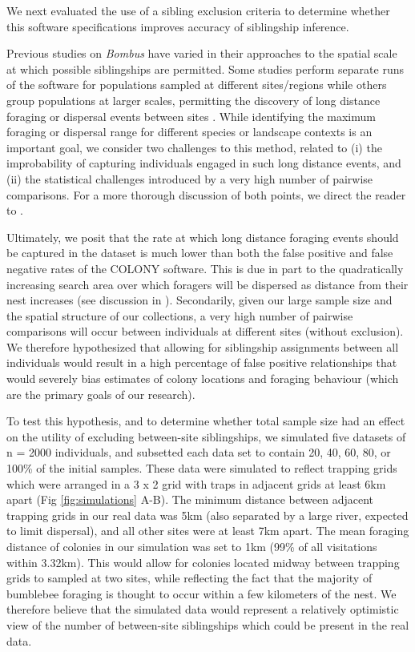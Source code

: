 \documentclass[12pt]{article}
\begin{document}
We next evaluated the use of a sibling exclusion criteria to determine whether this software specifications improves accuracy of siblingship inference. 

Previous studies on \emph{Bombus} have varied in their approaches to the spatial scale at which possible siblingships are permitted. Some studies perform separate runs of the software for populations sampled at different sites/regions \parencite{jhaResourceDiversityLandscapelevel2013} while others group populations at larger scales, permitting the discovery of long distance foraging or dispersal events between sites \parencite{lepaisEstimationBumblebeeQueen2010a, molaWildfireRevealsTransient2020, raoBumbleBeeHymenoptera2012}. While identifying the maximum foraging or dispersal range for different species or landscape contexts is an important goal, we consider two challenges to this method, related to (i) the improbability of capturing individuals engaged in such long distance events, and (ii) the statistical challenges introduced by a very high number of pairwise comparisons. For a more thorough discussion of both points, we direct the reader to \textcite{lepaisEstimationBumblebeeQueen2010a}. 

Ultimately, we posit that the rate at which long distance foraging events should be captured in the dataset is much lower than both the false positive and false negative rates of the COLONY software. This is due in part to the quadratically increasing search area over which foragers will be dispersed as distance from their nest increases (see discussion in \textcite{osborneBumblebeeFlightDistances2008}). Secondarily, given our large sample size and the spatial structure of our collections, a very high number of pairwise comparisons will occur between individuals at different sites (without exclusion). We therefore hypothesized that allowing for siblingship assignments between all individuals would result in a high percentage of false positive relationships that would severely bias estimates of colony locations and foraging behaviour (which are the primary goals of our research).

To test this hypothesis, and to determine whether total sample size had an effect on the utility of excluding between-site siblingships, we simulated five datasets of n = 2000 individuals, and subsetted each data set to contain 20, 40, 60, 80, or 100\% of the initial samples. These data were simulated to reflect trapping grids which were arranged in a 3 x 2 grid with traps in adjacent grids at least 6km apart (Fig \ref{fig:simulations} A-B). The minimum distance between adjacent trapping grids in our real data was 5km (also separated by a large river, expected to limit dispersal), and all other sites were at least 7km apart. The mean foraging distance of colonies in our simulation was set to 1km (99\% of all visitations within 3.32km). This would allow for colonies located midway between trapping grids to sampled at two sites, while reflecting the fact that the majority of bumblebee foraging is thought to occur within a few kilometers of the nest. We therefore believe that the simulated data would represent a relatively optimistic view of the number of between-site siblingships which could be present in the real data.
\end{document}
